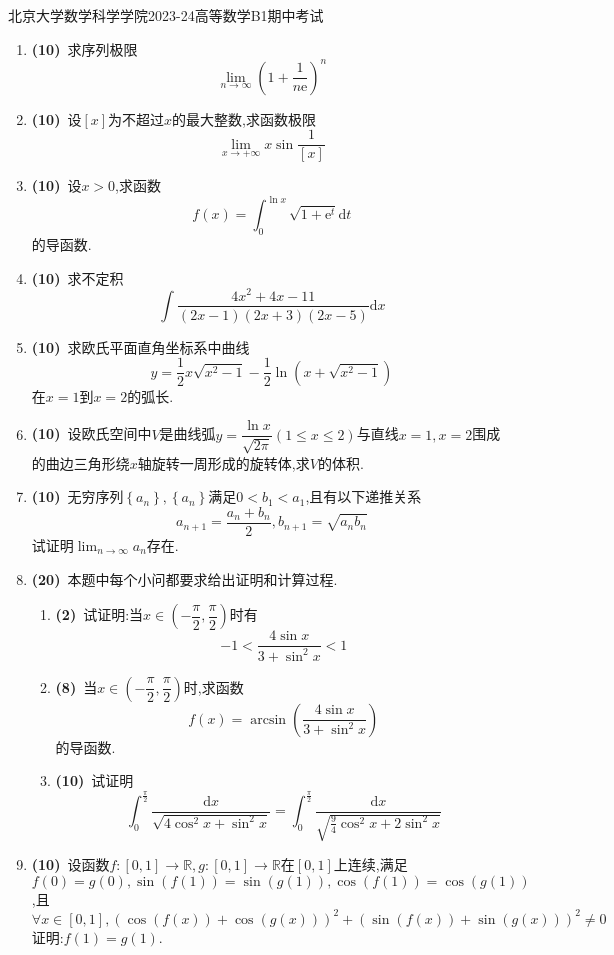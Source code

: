 \documentclass{ctexart}
\newcommand{\e}{\mathrm{e}}
\newcommand{\di}{\mathrm{d}}
\newcommand{\R}{\mathbb{R}}
\newcommand{\dx}{\di x}
\begin{document}
\pagestyle{empty}
\begin{center}\Large
    北京大学数学科学学院2023-24高等数学B1期中考试
\end{center}
\begin{enumerate}[leftmargin=*,label=\textbf{\arabic*.}]
    \item \textbf{(10)}\ 求序列极限$$\lim_{n\to\infty}{\left(1+\dfrac{1}{n\e}\right)^n}$$
    \item \textbf{(10)}\ 设$[x]$为不超过$x$的最大整数,求函数极限$$\lim_{x\to+\infty}{x\sin{\dfrac{1}{[x]}}}$$
    \item \textbf{(10)}\ 设$x>0$,求函数$$f(x)=\int_{0}^{\ln{x}}{\sqrt{1+\e^t}\di t}$$的导函数.
    \item \textbf{(10)}\ 求不定积$$\int{\dfrac{4x^2+4x-11}{(2x-1)(2x+3)(2x-5)}\dx}$$
    \item \textbf{(10)}\ 求欧氏平面直角坐标系中曲线$$y=\dfrac{1}{2}x\sqrt{x^2-1}-\dfrac{1}{2}\ln{\left(x+\sqrt{x^2-1}\right)}$$在$x=1$到$x=2$的弧长.
    \item \textbf{(10)}\ 设欧氏空间中$V$是曲线弧$\displaystyle y=\dfrac{\ln{x}}{\sqrt{2\pi}}(1\leqslant x\leqslant 2)$与直线$x=1,x=2$围成的曲边三角形绕$x$轴旋转一周形成的旋转体,求$V$的体积.
    \item \textbf{(10)}\ 无穷序列$\left\{a_n\right\},\left\{a_n\right\}$满足$0<b_1<a_1$,且有以下递推关系$$a_{n+1}=\dfrac{a_n+b_n}{2},b_{n+1}=\sqrt{a_nb_n}$$试证明$\displaystyle\lim_{n\to\infty}{a_n}$存在.
    \item \textbf{(20)}\ 本题中每个小问都要求给出证明和计算过程.
        \begin{enumerate}[label=\textbf{(\arabic*)}]
            \item \textbf{(2)}\ 试证明:当$x\in\left(-\dfrac{\pi}{2},\dfrac{\pi}{2}\right)$时有$$-1<\dfrac{4\sin{x}}{3+\sin^2{x}}<1$$
            \item \textbf{(8)}\ 当$x\in\left(-\dfrac{\pi}{2},\dfrac{\pi}{2}\right)$时,求函数$$f(x)=\arcsin{\left(\dfrac{4\sin{x}}{3+\sin^2{x}}\right)}$$的导函数.
            \item \textbf{(10)}\ 试证明$$\int_{0}^{\frac{\pi}{2}}{\dfrac{\dx}{\sqrt{4\cos^2{x}+\sin^2{x}}}}=\int_{0}^{\frac{\pi}{2}}{\dfrac{\dx}{\sqrt{\frac{9}{4}\cos^2{x}+2\sin^2{x}}}}$$
        \end{enumerate}
    \item \textbf{(10)}\ 设函数$f:[0,1]\to\R,g:[0,1]\to\R$在$[0,1]$上连续,满足$f(0)=g(0),\sin(f(1))=\sin(g(1)),\cos(f(1))=\cos(g(1))$,且
                  $$\forall x\in[0,1],\left(\cos(f(x))+\cos(g(x))\right)^2+\left(\sin(f(x))+\sin(g(x))\right)^2\neq 0$$
                  证明:$f(1)=g(1)$.
\end{enumerate}
\end{document}
